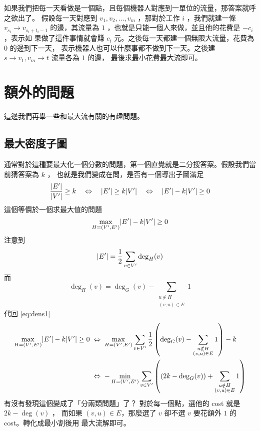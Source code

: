 \documentclass[a4paper,12pt]{book}
\begin{document}
如果我們把每一天看做是一個點，且每個機器人對應到一單位的流量，那答案就呼之欲出了。
假設每一天對應到 $v_1, v_2, \dots, v_m$ ，那對於工作 $i$ ，我們就建一條 $v_{s_i} \rightarrow 
v_{s_i+t_i-1}$ 的邊，其流量為 $1$ ，也就是只能一個人來做，並且他的花費是 $-c_i$，表示如
果做了這件事情就會賺 $c_i$ 元。之後每一天都建一個無限大流量，花費為 $0$ 的邊到下一天，
表示機器人也可以什麼事都不做到下一天。之後建 $s \rightarrow v_1, v_{m} \rightarrow t$ 
流量各為 $1$ 的邊， 最後求最小花費最大流即可。

\section{額外的問題}
這邊我們再舉一些和最大流有關的有趣問題。

\subsection{最大密度子圖}

通常對於這種要最大化一個分數的問題，第一個直覺就是二分搜答案。假設我們當前猜答案為 $k$ ，
也就是我們變成在問，是否有一個導出子圖滿足
\[ \frac{\lvert E' \rvert}{\lvert V' \rvert} \geq k \quad \Leftrightarrow \quad \lvert E' \rvert \geq k \lvert V' \rvert 
  \quad \Leftrightarrow \quad \lvert E' \rvert - k \lvert V' \rvert \geq 0 \]
這個等價於一個求最大值的問題
\begin{equation}
\max_{H = (V', E')} \lvert E' \rvert - k \lvert V' \rvert \geq 0
\label{eq:dens1}
\end{equation}
注意到
\[ \lvert E' \rvert = \frac{1}{2} \sum_{v \in V'} \deg_H(v)  \]
而
\[ \deg_H(v) = \deg_G(v) - \sum_{\substack{u \notin H \\ (v, u) \in E}} 1 \]
代回 \eqref{eq:dens1} 
\begin{align*}
  \max_{H = (V', E')} \lvert E' \rvert - k \lvert V' \rvert \geq 0 \; & \Leftrightarrow \;
  \max_{H = (V', E')} \sum_{v \in V'} \frac{1}{2} \left( \deg_G(v) -
      \sum_{\substack{u \notin H \\ (v, u) \in E}} 1 \right) - k \\
    & \Leftrightarrow \; - \min_{H = (V', E')} \sum_{v \in V'} \left( \left(2k - \deg_G(v) \right) +
      \sum_{\substack{u \notin H \\ (v, u) \in E}} 1 \right) \\
\end{align*}
有沒有發現這個變成了「分兩類問題」了？ 對於每一個點，選他的 cost 就是 $2k - \deg(v)$ ，
而如果 $(v, u) \in E$，那麼選了 $v$ 卻不選 $v$ 要花額外 $1$ 的 cost。轉化成最小割後用
最大流解即可。
\end{document}
